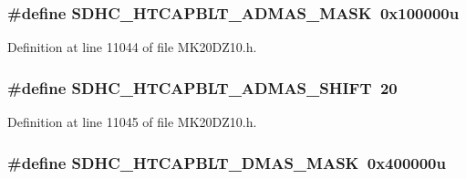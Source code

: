 \subsubsection[{\texorpdfstring{S\+D\+H\+C\+\_\+\+H\+T\+C\+A\+P\+B\+L\+T\+\_\+\+A\+D\+M\+A\+S\+\_\+\+M\+A\+SK}{SDHC_HTCAPBLT_ADMAS_MASK}}]{\setlength{\rightskip}{0pt plus 5cm}\#define S\+D\+H\+C\+\_\+\+H\+T\+C\+A\+P\+B\+L\+T\+\_\+\+A\+D\+M\+A\+S\+\_\+\+M\+A\+SK~0x100000u}\hypertarget{group___s_d_h_c___register___masks_gadb87583a1db8c53c61fdac8604e1ecc5}{}\label{group___s_d_h_c___register___masks_gadb87583a1db8c53c61fdac8604e1ecc5}


Definition at line 11044 of file M\+K20\+D\+Z10.\+h.

\subsubsection[{\texorpdfstring{S\+D\+H\+C\+\_\+\+H\+T\+C\+A\+P\+B\+L\+T\+\_\+\+A\+D\+M\+A\+S\+\_\+\+S\+H\+I\+FT}{SDHC_HTCAPBLT_ADMAS_SHIFT}}]{\setlength{\rightskip}{0pt plus 5cm}\#define S\+D\+H\+C\+\_\+\+H\+T\+C\+A\+P\+B\+L\+T\+\_\+\+A\+D\+M\+A\+S\+\_\+\+S\+H\+I\+FT~20}\hypertarget{group___s_d_h_c___register___masks_ga6ceeb752d9ccad530b178fef829a9db6}{}\label{group___s_d_h_c___register___masks_ga6ceeb752d9ccad530b178fef829a9db6}


Definition at line 11045 of file M\+K20\+D\+Z10.\+h.

\subsubsection[{\texorpdfstring{S\+D\+H\+C\+\_\+\+H\+T\+C\+A\+P\+B\+L\+T\+\_\+\+D\+M\+A\+S\+\_\+\+M\+A\+SK}{SDHC_HTCAPBLT_DMAS_MASK}}]{\setlength{\rightskip}{0pt plus 5cm}\#define S\+D\+H\+C\+\_\+\+H\+T\+C\+A\+P\+B\+L\+T\+\_\+\+D\+M\+A\+S\+\_\+\+M\+A\+SK~0x400000u}\hypertarget{group___s_d_h_c___register___masks_ga5252cbd3675e74a01efa99cf6b754c8a}{}\label{group___s_d_h_c___register___masks_ga5252cbd3675e74a01efa99cf6b754c8a}


